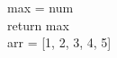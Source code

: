 \documentclass[preview]{standalone}
\begin{document}
max = num\\return max\\arr = [1, 2, 3, 4, 5]\\
\end{document}
